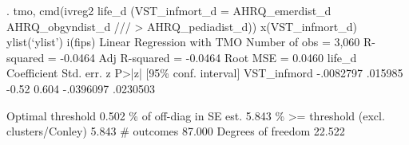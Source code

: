 . tmo, cmd(ivreg2 life_d (VST_infmort_d = AHRQ_emerdist_d AHRQ_obgyndist_d ///
>     AHRQ_pediadist_d)) x(VST_infmort_d) ylist(`ylist') i(fips)
{\smallskip}
Linear Regression with TMO                             Number of obs =   3,060
                                                       R-squared     = -0.0464
                                                       Adj R-squared = -0.0464
                                                       Root MSE      =  0.0460
{\smallskip}
      life_d {\VBAR} Coefficient  Std. err.      z    P>|z|     [95\% conf. interval]
VST_infmor{\tytilde}d {\VBAR}  -.0082797    .015985    -0.52   0.604    -.0396097    .0230503
                                                                               
                                                   Optimal threshold      0.502
                                            \% of off-diag in SE est.      5.843
                              \% >= threshold (excl. clusters/Conley)      5.843
                                                          \# outcomes     87.000
                                                  Degrees of freedom     22.522
